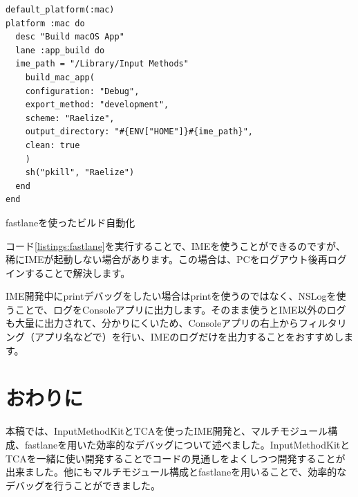 \documentclass[uplatex,a4j,12pt,twocolumn]{jsarticle}
\begin{document}
\begin{listing}[h]
  \begin{verbatim}
default_platform(:mac)
platform :mac do
  desc "Build macOS App"
  lane :app_build do
  ime_path = "/Library/Input Methods"
    build_mac_app(
    configuration: "Debug",
    export_method: "development",
    scheme: "Raelize",
    output_directory: "#{ENV["HOME"]}#{ime_path}",
    clean: true
    )
    sh("pkill", "Raelize")
  end
end
  \end{verbatim}
  \caption{fastlaneを使ったビルド自動化}\label{listings:fastlane}
\end{listing}

コード\ref{listings:fastlane}を実行することで、IMEを使うことができるのですが、稀にIMEが起動しない場合があります。この場合は、PCをログアウト後再ログインすることで解決します。

IME開発中にprintデバッグをしたい場合はprintを使うのではなく、NSLogを使うことで、ログをConsoleアプリ\cite{bib:console}に出力します。そのまま使うとIME以外のログも大量に出力されて、分かりにくいため、Consoleアプリの右上からフィルタリング（アプリ名などで）を行い、IMEのログだけを出力することをおすすめします。

\section{おわりに}\label{sec:conclusion}
本稿では、InputMethodKitとTCAを使ったIME開発と、マルチモジュール構成、fastlaneを用いた効率的なデバッグについて述べました。InputMethodKitとTCAを一緒に使い開発することでコードの見通しをよくしつつ開発することが出来ました。他にもマルチモジュール構成とfastlaneを用いることで、効率的なデバッグを行うことができました。

 
 
\end{document}

